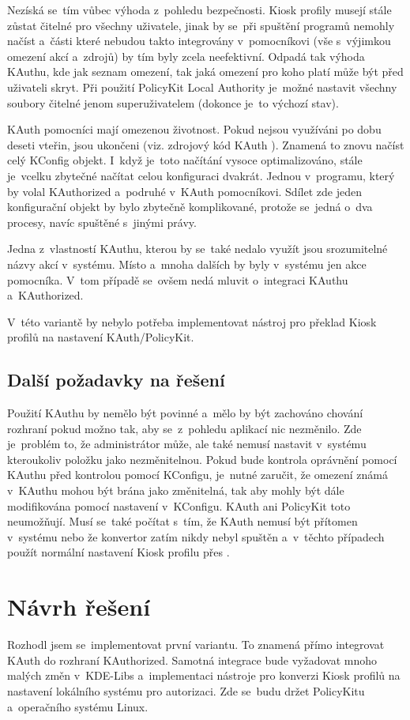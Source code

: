 Nezíská se~tím vůbec výhoda z~pohledu bezpečnosti. Kiosk profily musejí stále zůstat čitelné pro všechny uživatele, jinak by se~při spuštění programů nemohly načíst a~části které nebudou takto integrovány v~pomocníkovi (vše s~výjimkou omezení akcí a~zdrojů) by tím byly zcela neefektivní. Odpadá tak výhoda KAuthu, kde jak seznam omezení, tak jaká omezení pro koho platí může být před uživateli skryt. Při použití PolicyKit Local Authority je~možné nastavit všechny soubory čitelné jenom superuživatelem (dokonce je~to výchozí stav).

KAuth pomocníci mají omezenou životnost. Pokud nejsou využíváni po dobu deseti vteřin, jsou ukončeni (viz. zdrojový kód KAuth \cite{codeKAuth}). Znamená to znovu načíst celý KConfig objekt. I~když je~toto načítání vysoce optimalizováno, stále je~vcelku zbytečné načítat celou konfiguraci dvakrát. Jednou v~programu, který by volal KAuthorized a~podruhé v~KAuth pomocníkovi. Sdílet zde jeden konfigurační objekt by bylo zbytečně komplikované, protože se~jedná o~dva procesy, navíc spuštěné s~jinými právy.

Jedna z~vlastností KAuthu, kterou by se~také nedalo využít jsou srozumitelné názvy akcí v~systému. Místo  a~mnoha dalších by byly v~systému jen akce pomocníka. V~tom případě se~ovšem nedá mluvit o~integraci KAuthu a~KAuthorized.

V~této variantě by nebylo potřeba implementovat nástroj pro překlad Kiosk profilů na nastavení KAuth/PolicyKit.

\subsection*{Další požadavky na řešení}
Použití KAuthu by nemělo být povinné a~mělo by být zachováno chování rozhraní  pokud možno tak, aby se~z~pohledu aplikací nic nezměnilo. Zde je~problém to, že administrátor může, ale také nemusí nastavit v~systému  kteroukoliv položku jako nezměnitelnou. Pokud bude kontrola oprávnění pomocí KAuthu před kontrolou pomocí KConfigu, je~nutné zaručit, že omezení známá v~KAuthu mohou být brána jako změnitelná, tak aby mohly být dále modifikována pomocí nastavení v~KConfigu. KAuth ani PolicyKit toto neumožňují. Musí se~také počítat s~tím, že KAuth nemusí být přítomen v~systému nebo že konvertor zatím nikdy nebyl spuštěn a~v~těchto případech použít normální nastavení Kiosk profilu přes .

\section{Návrh řešení}\label{mozres}
Rozhodl jsem se~implementovat první variantu. To znamená přímo integrovat KAuth do rozhraní KAuthorized. Samotná integrace bude vyžadovat mnoho malých změn v~KDE-Libs a~implementaci nástroje pro konverzi Kiosk profilů na nastavení lokálního systému pro autorizaci. Zde se~budu držet PolicyKitu a~operačního systému Linux.

